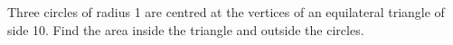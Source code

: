 Three circles of radius 1 are centred at the vertices of an equilateral triangle of side 10. Find the area inside the triangle and outside the circles.
